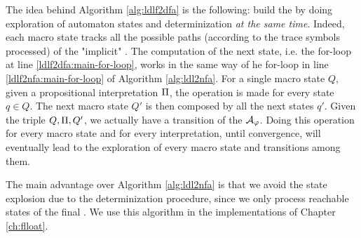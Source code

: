 The idea behind Algorithm \ref{alg:ldlf2dfa} is the following: build the \DFA by doing exploration of automaton states and determinization \emph{at the same time}. Indeed, each macro state tracks all the  possible paths (according to the trace symbols processed) of the "implicit" \NFA. The computation of the next \NFA state, i.e. the for-loop at line \ref{ldlf2dfa:main-for-loop}, works in the same way of he for-loop in line \ref{ldlf2nfa:main-for-loop} of Algorithm \ref{alg:ldl2nfa}. For a single macro state $Q$, given a propositional interpretation $\Pi$, the operation is made for every \NFA state $q\in Q$. The next macro state $Q'$ is then composed by all the next \NFA states $q'$. Given the triple $Q, \Pi, Q'$, we actually have a transition of the \DFA $\mathcal{A}_\varphi$. Doing this operation for every macro state and for every interpretation, until convergence, will eventually lead to the exploration of every macro state and transitions among them. 

The main advantage over Algorithm \ref{alg:ldl2nfa} is that we avoid the state explosion due to the determinization procedure, since we only process reachable states of the final \DFA. We use this algorithm in the implementations of Chapter \ref{ch:flloat}.

